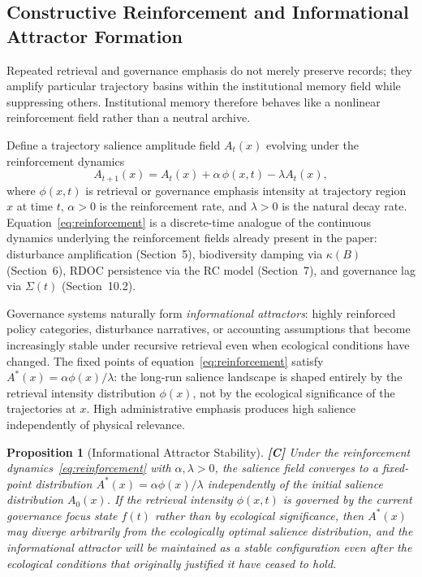 \documentclass[12pt]{article}
\newtheorem{proposition}{Proposition}
\begin{document}
\subsection{Constructive Reinforcement and Informational Attractor Formation}

Repeated retrieval and governance emphasis do not merely preserve records; they amplify
particular trajectory basins within the institutional memory field while suppressing
others. Institutional memory therefore behaves like a nonlinear reinforcement field
rather than a neutral archive.

Define a trajectory salience amplitude field $A_t(x)$ evolving under the reinforcement
dynamics
\begin{equation}
\label{eq:reinforcement}
A_{t+1}(x) = A_t(x) + \alpha\,\phi(x,t) - \lambda A_t(x),
\end{equation}
where $\phi(x,t)$ is retrieval or governance emphasis intensity at trajectory region $x$
at time $t$, $\alpha > 0$ is the reinforcement rate, and $\lambda > 0$ is the natural
decay rate. Equation~\eqref{eq:reinforcement} is a discrete-time analogue of the
continuous dynamics underlying the reinforcement fields already present in the paper:
disturbance amplification (Section~5), biodiversity damping via $\kappa(B)$ (Section~6),
RDOC persistence via the RC model (Section~7), and governance lag via $\Sigma(t)$
(Section~10.2).

Governance systems naturally form \emph{informational attractors}: highly reinforced
policy categories, disturbance narratives, or accounting assumptions that become
increasingly stable under recursive retrieval even when ecological conditions have changed.
The fixed points of equation~\eqref{eq:reinforcement} satisfy $A^*(x) = \alpha\phi(x)/\lambda$:
the long-run salience landscape is shaped entirely by the retrieval intensity distribution
$\phi(x)$, not by the ecological significance of the trajectories at $x$. High
administrative emphasis produces high salience independently of physical relevance.

\begin{proposition}[Informational Attractor Stability]
\label{prop:attractor}
\textbf{[C]} Under the reinforcement dynamics~\eqref{eq:reinforcement} with $\alpha,\lambda>0$,
the salience field converges to a fixed-point distribution
$A^*(x) = \alpha\phi(x)/\lambda$ independently of the initial salience distribution
$A_0(x)$. If the retrieval intensity $\phi(x,t)$ is governed by the current governance
focus state $f(t)$ rather than by ecological significance, then $A^*(x)$ may diverge
arbitrarily from the ecologically optimal salience distribution, and the informational
attractor will be maintained as a stable configuration even after the ecological
conditions that originally justified it have ceased to hold.
\end{proposition}
\end{document}
